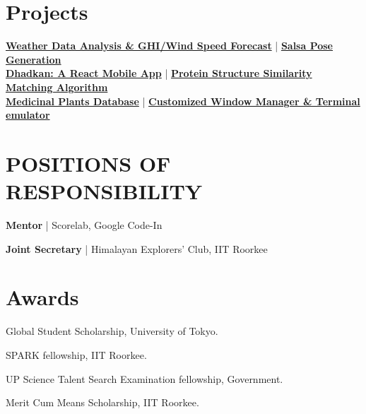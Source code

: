 \documentclass[]{durgesh_resume}
\begin{document}
\begin{minipage}[t]{0.66\textwidth}

\section{Projects}
\runsubsection{}
\href{https://github.com/orionpax00/weather}{\bf \normalsize Weather Data Analysis \& GHI/Wind Speed Forecast} | \href{https://github.com/orionpax00/salsa_synthesis}{\bf \normalsize Salsa Pose Generation} \\
\href{https://github.com/orionpax00/dhadkan}{\bf \normalsize Dhadkan: A React Mobile App} | \href{https://github.com/orionpax00/ppi}{\bf \normalsize Protein Structure Similarity Matching Algorithm} \\
\href{https://github.com/orionpax00/dispel}{\bf \normalsize Medicinal Plants Database} | \href{https://github.com/orionpax00/dwm}{\bf \normalsize Customized Window Manager \& Terminal emulator}
\sectionsep


\section{POSITIONS OF RESPONSIBILITY} 
\vspace{\topsep}
\begin{tightemize}
\item \normalsize \textbf{Mentor} | Scorelab, Google Code-In 
\item \normalsize \textbf{Joint Secretary} | Himalayan Explorers' Club, IIT Roorkee
\end{tightemize}
\sectionsep


\section{Awards} 
\vspace{\topsep}
\begin{tightemize}
\item \normalsize Global Student Scholarship, University of Tokyo.
\item \normalsize SPARK fellowship, IIT Roorkee.
\item \normalsize UP Science Talent Search Examination fellowship, Government.
\item \normalsize Merit Cum Means Scholarship, IIT Roorkee.
\end{tightemize}
\sectionsep




\end{minipage}
\end{document}

